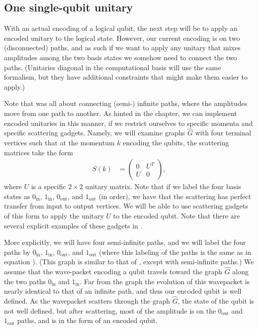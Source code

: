 \documentclass[../thesis-main/thesis-main]{subfiles}
\begin{document}

\subsection{One single-qubit unitary}\label{sec:SP_1_single_qubit_unitary}

With an actual encoding of a logical qubit, the next step will be to apply an encoded unitary to the logical state.  However, our current encoding is on two (disconnected) paths, and as such if we want to apply any unitary that mixes amplitudes among the two basis states we somehow need to connect the two paths. (Unitaries diagonal in the computational basis will use the same formalism, but they have additional constraints that might make them easier to apply.)


Note that  was all about connecting (semi-) infinite paths, where the amplitudes move from one path to another.  As hinted in the chapter, we can implement encoded unitaries in this manner, if we restrict ourselves to specific momenta and specific scattering gadgets.  Namely, we will examine graphs $\widehat{G}$ with four terminal vertices such that at the momentum $k$ encoding the qubits, the scattering matrices take the form
\begin{align}
  S(k) &= \begin{pmatrix} 0 & U^{T} \\
  U & 0\end{pmatrix},
  \label{eq:unitary_s_matrix}
\end{align}
where $U$ is a specific $2\times 2$ unitary matrix.  Note that if we label the four basis states as $0_{\text{in}}$, $1_{\text{in}}$, $0_{\text{out}}$, and $1_{\text{out}}$ (in order), we have that the scattering has perfect transfer from input to output vertices.  We will be able to use scattering gadgets of this form to apply the unitary $U$ to the encoded qubit.  Note that there are several explicit examples of these gadgets in .

More explicitly, we will have four semi-infinite paths, and we will label the four paths by $0_{\text{in}}$, $1_{\text{in}}$, $0_{\text{out}}$, and $1_{\text{out}}$ (where this labeling of the paths is the same as in equation ).  (This graph is similar to that of , except with semi-infinite paths.) We assume that the wave-packet encoding a qubit travels toward the graph $\widehat{G}$ along the two paths $0_{\text{in}}$ and $1_{\text{in}}$.  Far from the graph the evolution of this wavepacket is nearly identical to that of an infinite path, and thus our encoded qubit is well defined.  As the wavepacket scatters through the graph $\widehat{G}$, the state of the qubit is not well defined, but after scattering, most of the amplitude is on the $0_{\text{out}}$ and $1_{\text{out}}$ paths, and is in the form of an encoded qubit. 
\end{document}
